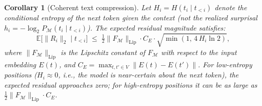 \documentclass[11pt]{article}
\newtheorem{corollary}{Corollary}
\begin{document}
\begin{corollary}[Coherent text compression]
\label{cor:coherent}
Let $H_i = H(t_i \mid t_{<i})$ denote the conditional entropy of the next token
given the context (not the realized surprisal $h_i = -\log_2 P_{\mathcal{M}}(t_i \mid t_{<i})$).
The expected residual magnitude satisfies:
\[
  \mathbb{E}\bigl[\|R_i\|_2 \;\big|\; t_{<i}\bigr]
  \;\leq\; \tfrac{1}{2}\|F_{\mathcal{M}}\|_{\mathrm{Lip}} \cdot C_E \cdot \sqrt{\min(1,\, 4\,H_i \ln 2)},
\]
where $\|F_{\mathcal{M}}\|_{\mathrm{Lip}}$ is the Lipschitz constant of $F_{\mathcal{M}}$
with respect to the input embedding $E(t)$, and
$C_E = \max_{t,t' \in V} \|E(t) - E(t')\|$.
For low-entropy positions ($H_i \approx 0$, i.e., the model is near-certain about the next token),
the expected residual approaches zero;
for high-entropy positions it can be as large as $\tfrac{1}{2}\|F_{\mathcal{M}}\|_{\mathrm{Lip}} \cdot C_E$.
\end{corollary}
\end{document}

